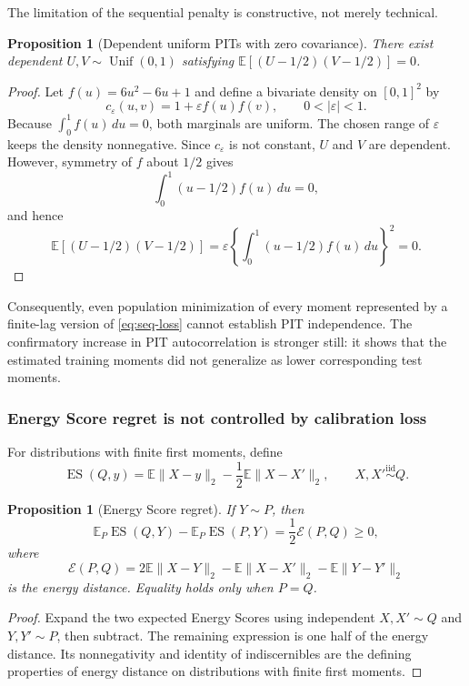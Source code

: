\documentclass[11pt]{article}
\newtheorem{proposition}[definition]{Proposition}
\newcommand{\E}{\mathbb{E}}
\begin{document}
The limitation of the sequential penalty is constructive, not merely technical.

\begin{proposition}[Dependent uniform PITs with zero covariance]
There exist dependent $U,V\sim\operatorname{Unif}(0,1)$ satisfying
$\E[(U-1/2)(V-1/2)]=0$.
\end{proposition}

\begin{proof}
Let $f(u)=6u^2-6u+1$ and define a bivariate density on $[0,1]^2$ by
\[
 c_\varepsilon(u,v)=1+\varepsilon f(u)f(v),
 \qquad 0<|\varepsilon|<1.
\]
Because $\int_0^1 f(u)\,du=0$, both marginals are uniform. The chosen range of
$\varepsilon$ keeps the density nonnegative. Since $c_\varepsilon$ is not
constant, $U$ and $V$ are dependent. However, symmetry of $f$ about $1/2$ gives
\[
 \int_0^1(u-1/2)f(u)\,du=0,
\]
and hence
\[
 \E[(U-1/2)(V-1/2)]
 =\varepsilon\left\{\int_0^1(u-1/2)f(u)\,du\right\}^2=0.
\]
\end{proof}

Consequently, even population minimization of every moment represented by a
finite-lag version of \eqref{eq:seq-loss} cannot establish PIT independence.
The confirmatory increase in PIT autocorrelation is stronger still: it shows that
the estimated training moments did not generalize as lower corresponding test
moments.

\subsubsection{Energy Score regret is not controlled by calibration loss}

For distributions with finite first moments, define
\[
 \operatorname{ES}(Q,y)
 =\E\|X-y\|_2-\frac12\E\|X-X'\|_2,
 \qquad X,X'\stackrel{\mathrm{iid}}\sim Q.
\]

\begin{proposition}[Energy Score regret]
If $Y\sim P$, then
\begin{equation}
 \E_P\operatorname{ES}(Q,Y)-\E_P\operatorname{ES}(P,Y)
 =\frac12\mathcal E(P,Q)\geq0,
 \label{eq:energy-regret}
\end{equation}
where
\[
 \mathcal E(P,Q)=2\E\|X-Y\|_2-\E\|X-X'\|_2-\E\|Y-Y'\|_2
\]
is the energy distance. Equality holds only when $P=Q$.
\end{proposition}

\begin{proof}
Expand the two expected Energy Scores using independent
$X,X'\sim Q$ and $Y,Y'\sim P$, then subtract. The remaining expression is one
half of the energy distance. Its nonnegativity and identity of indiscernibles are
the defining properties of energy distance on distributions with finite first
moments.
\end{proof}
\end{document}
